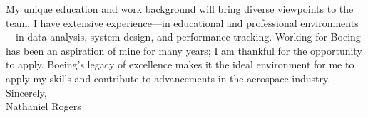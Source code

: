 \medskip
\hspace{1cm}My unique education and work background will bring diverse viewpoints to the team. I have extensive experience---in educational and professional environments---in data analysis, system design, and performance tracking. Working for Boeing has been an aspiration of mine for many years; I am thankful for the opportunity to apply. Boeing's legacy of excellence makes it the ideal environment for me to apply my skills and contribute to advancements in the aerospace industry. \\
\bigskip
Sincerely, \\
\medskip
Nathaniel Rogers
